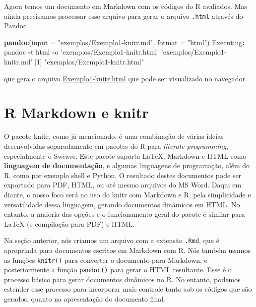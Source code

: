 \documentclass[10pt,a4paper]{book}
\newenvironment{Shaded}{\begin{snugshade}}{\end{snugshade}}
\newcommand{\KeywordTok}[1]{\textcolor[rgb]{0.13,0.29,0.53}{\textbf{#1}}}
\newcommand{\DataTypeTok}[1]{\textcolor[rgb]{0.13,0.29,0.53}{#1}}
\newcommand{\DecValTok}[1]{\textcolor[rgb]{0.00,0.00,0.81}{#1}}
\newcommand{\StringTok}[1]{\textcolor[rgb]{0.31,0.60,0.02}{#1}}
\newcommand{\OperatorTok}[1]{\textcolor[rgb]{0.81,0.36,0.00}{\textbf{#1}}}
\newcommand{\NormalTok}[1]{#1}
\begin{document}
Agora temos um documento em Markdown com os códigos do R avaliados. Mas
ainda precisamos processar esse arquivo para gerar o arquivo
\texttt{.html} através do Pandoc

\begin{Shaded}
\begin{Highlighting}[]
\KeywordTok{pandoc}\NormalTok{(}\DataTypeTok{input =} \StringTok{"exemplos/Exemplo1-knitr.md"}\NormalTok{, }\DataTypeTok{format =} \StringTok{"html"}\NormalTok{)}
\NormalTok{Executing}\OperatorTok{:}\StringTok{ }\NormalTok{pandoc }\OperatorTok{-}\NormalTok{t html }\OperatorTok{-}\NormalTok{o }\StringTok{'exemplos/Exemplo1-knitr.html'} \StringTok{'exemplos/Exemplo1-knitr.md'}
\NormalTok{[}\DecValTok{1}\NormalTok{] }\StringTok{"exemplos/Exemplo1-knitr.html"}
\end{Highlighting}
\end{Shaded}

que gera o arquivo
\href{exemplos/Exemplo1-knitr.html}{Exemplo1-knitr.html} que pode ser
visualizado no navegador.

\section{R Markdown e knitr}\label{r-markdown-e-knitr}

O pacote knitr, como já mencionado, é uma combinação de várias ideias
desenvolvidas separadamente em pacotes do R para \emph{literate
programming}, especialmente o Sweave. Este pacote suporta LaTeX,
Markdown e HTML como \textbf{linguagem de documentação}, e algumas
linguagens de programação, além do R, como por exemplo shell e Python. O
resultado destes documentos pode ser exportado para PDF, HTML, ou até
mesmo arquivos do MS Word. Daqui em diante, o nosso foco será no uso do
knitr com Markdown e R, pela simplicidade e versatilidade dessa
linguagem, gerando documentos dinâmicos em HTML. No entanto, a maioria
das opções e o funcionamento geral do pacote é similar para LaTeX (e
compilação para PDF) e HTML.

Na seção anterior, nós criamos um arquivo com a extensão \texttt{.Rmd},
que é apropriada para documentos escritos em Markdown com R. Nós também
usamos as funções \texttt{knitr()} para converter o documento para
Markdown, e posteriormente a função \texttt{pandoc()} para gerar o HTML
resultante. Esse é o processo básico para gerar documentos dinâmicos no
R. No entanto, podemos estender esse processo para incorporar mais
controle tanto sob os códigos que são gerados, quanto na apresentação do
documento final.
\end{document}
